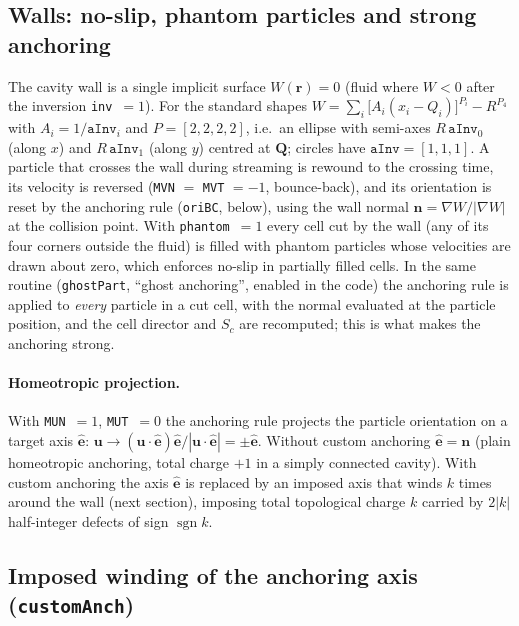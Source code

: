 \subsection{Walls: no-slip, phantom particles and strong anchoring}
\label{sec:md-walls}

The cavity wall is a single implicit surface $W(\mathbf r)=0$ (fluid where $W<0$ after the
inversion \texttt{inv}~$=1$). For the standard shapes
$W=\sum_{i}\big[A_i(x_i-Q_i)\big]^{P_i}-R^{P_4}$ with $A_i=1/\texttt{aInv}_i$ and $P=[2,2,2,2]$,
i.e.\ an ellipse with semi-axes $R\,\texttt{aInv}_0$ (along $x$) and $R\,\texttt{aInv}_1$ (along $y$)
centred at $\mathbf Q$; circles have $\texttt{aInv}=[1,1,1]$.
A particle that crosses the wall during streaming is rewound to the crossing time, its velocity is
reversed (\texttt{MVN} $=$ \texttt{MVT} $=-1$, bounce-back), and its orientation is reset by
the anchoring rule (\texttt{oriBC}, below), using the wall normal $\mathbf n=\nabla W/|\nabla W|$ at the
collision point. With \texttt{phantom}~$=1$ every cell cut by the wall (any of its four corners outside
the fluid) is filled with phantom particles whose velocities are drawn about zero, which enforces
no-slip in partially filled cells. In the same routine (\texttt{ghostPart}, ``ghost anchoring'', enabled in
the code) the anchoring rule is applied to \emph{every} particle in a cut cell, with the normal
evaluated at the particle position, and the cell director and $S_c$ are recomputed; this
is what makes the anchoring strong.

\paragraph{Homeotropic projection.} With \texttt{MUN}~$=1$, \texttt{MUT}~$=0$ the anchoring rule
projects the particle orientation on a target axis $\hat{\mathbf e}$:
$\mathbf u\to(\mathbf u\cdot\hat{\mathbf e})\hat{\mathbf e}/|\mathbf u\cdot\hat{\mathbf e}|=\pm\hat{\mathbf e}$.
Without custom anchoring $\hat{\mathbf e}=\mathbf n$ (plain homeotropic anchoring, total charge $+1$ in a
simply connected cavity). With custom anchoring the axis $\hat{\mathbf e}$ is replaced by an imposed
axis that winds $k$ times around the wall (next section), imposing total topological charge $k$
carried by $2|k|$ half-integer defects of sign $\operatorname{sgn}k$.

\subsection{Imposed winding of the anchoring axis (\texttt{customAnch})}
\label{sec:md-anch}

